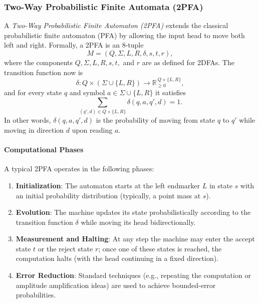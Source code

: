 \subsubsection{Two-Way Probabilistic Finite Automata (2PFA)}
\label{subsubsec:2pfa}

A \emph{Two-Way Probabilistic Finite Automaton (2PFA)} extends the classical probabilistic finite automaton (PFA) by allowing the input head to move both left and right. Formally, a 2PFA is an 8-tuple
\[
M = (Q, \Sigma, L, R, \delta, s, t, r),
\]
where the components \(Q, \Sigma, L, R, s, t,\) and \(r\) are as defined for 2DFAs. The transition function now is
\[
\delta: Q \times (\Sigma \cup \{L,R\}) \to \mathbb{R}_{\ge 0}^{\,Q \times \{L,R\}},
\]
and for every state \(q\) and symbol \(a\in\Sigma\cup\{L,R\}\) it satisfies
\[
\sum_{(q',d)\in Q\times\{L,R\}} \delta(q,a,q',d) = 1.
\]
In other words, \(\delta(q,a,q',d)\) is the probability of moving from state \(q\) to \(q'\) while moving in direction \(d\) upon reading \(a\).

\paragraph{Computational Phases}
A typical 2PFA operates in the following phases:
\begin{enumerate}
    \item \textbf{Initialization}: The automaton starts at the left endmarker \(L\) in state \(s\) with an initial probability distribution (typically, a point mass at \(s\)).
    \item \textbf{Evolution}: The machine updates its state probabilistically according to the transition function \(\delta\) while moving its head bidirectionally.
    \item \textbf{Measurement and Halting}: At any step the machine may enter the accept state \(t\) or the reject state \(r\); once one of these states is reached, the computation halts (with the head continuing in a fixed direction).
    \item \textbf{Error Reduction}: Standard techniques (e.g., repeating the computation or amplitude amplification ideas) are used to achieve bounded-error probabilities.
\end{enumerate}

